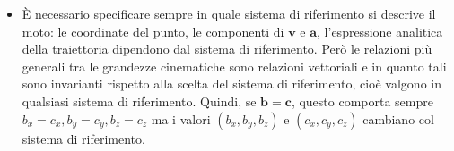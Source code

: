 \documentclass[class=book, crop=false, oneside, 12pt]{standalone}
\begin{document}
\begin{itemize}
  \item È necessario specificare sempre in quale sistema di riferimento si descrive il moto: le coordinate del punto, le componenti di \(\boldsymbol{v}\) e \(\boldsymbol{a}\), l'espressione analitica della traiettoria dipendono dal sistema di riferimento. Però le relazioni più generali tra le grandezze cinematiche sono relazioni vettoriali e in quanto tali sono invarianti rispetto alla scelta del sistema di riferimento, cioè valgono in qualsiasi sistema di riferimento.
  Quindi, se \(\mathbf{b}=\mathbf{c}\), questo comporta sempre \(b_{x}=c_{x}, b_{y}=c_{y}, b_{z}=c_{z}\) ma i valori \(\left(b_{x}, b_{y}, b_{z}\right)\) e \(\left(c_{x}, c_{y}, c_{z}\right)\) cambiano col sistema di riferimento.
\end{itemize}
\end{document}

